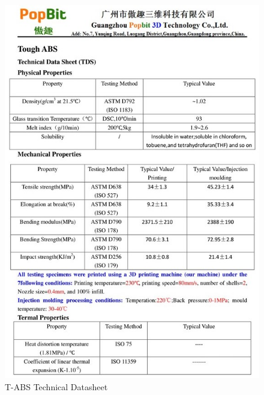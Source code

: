 \documentclass[english]{upeeei}
\begin{document}
\begin{figure}[H]
\begin{centering}
\includegraphics[width=0.8\columnwidth]{images/tabs}
\par\end{centering}
\caption{T-ABS Technical Datasheet\label{fig:tabs}}
\end{figure}

\cleardoublepage
\end{document}
